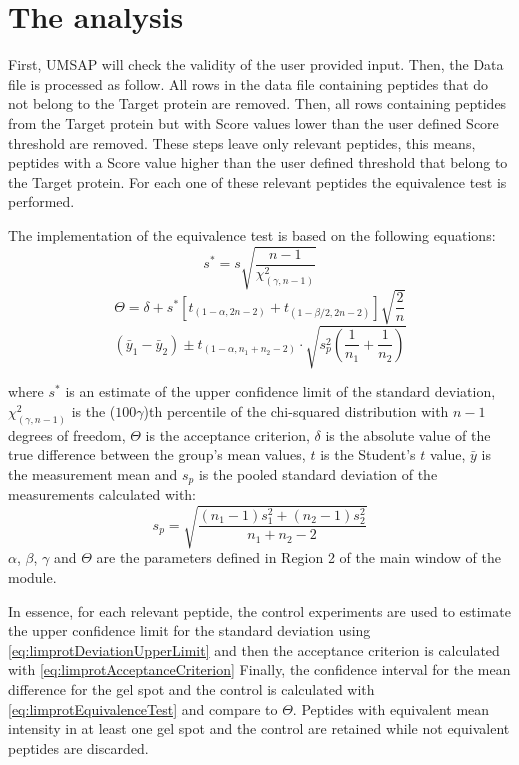 \section{The analysis}
\label{sec:limprotEquivalenceTest}
First, UMSAP will check the validity of the user provided input. Then, the Data file is processed as follow. All rows in the data file containing peptides that do not belong to the Target protein are removed. Then, all rows containing peptides from the Target protein but with Score values lower than the user defined Score threshold are removed. These steps leave only relevant peptides, this means, peptides with a Score value higher than the user defined threshold that belong to the Target protein. For each one of these relevant peptides the equivalence test is performed\cite{Limentani2005}.

The implementation of the equivalence test is based on the following equations:
\begin{equation}
	\label{eq:limprotDeviationUpperLimit}
	s^* = s\sqrt{\frac{n-1}{\chi^2_{(\gamma, n-1)}}}
\end{equation}
\begin{equation}
\label{eq:limprotAcceptanceCriterion}
\Theta = \delta + s^*\left[t_{(1-\alpha, 2n-2)} + t_{(1-\beta/2, 2n-2)}\right]\sqrt{\frac{2}{n}}
\end{equation}
\begin{equation}
\label{eq:limprotEquivalenceTest}
(\bar{y}_1 - \bar{y}_2) \pm t_{(1-\alpha, n_1+n_2-2)} \cdot \sqrt{s^2_p\left(\frac{1}{n_1}+\frac{1}{n_2}\right)}
\end{equation}

where $s^*$ is an estimate of the upper confidence limit of the standard deviation, $\chi^2_{(\gamma, n-1)}$ is the ($100\gamma$)th percentile of the chi-squared distribution with $n-1$ degrees of freedom, $\Theta$ is the acceptance criterion, $\delta$ is the absolute value of the true difference between the group's mean values, $t$ is the Student's $t$ value, $\bar{y}$ is the measurement mean and $s_p$ is the pooled standard deviation of the measurements calculated with:
\begin{equation}
\label{eq:poolStDev}
s_p =  \sqrt{\frac{(n_1-1)s^2_1+(n_2-1)s^2_2}{n_1+n_2-2}}
\end{equation}
$\alpha$, $\beta$, $\gamma$ and $\Theta$ are the parameters defined in Region \num{2} of the main window of the module.

In essence, for each relevant peptide, the control experiments are used to estimate the upper confidence limit for the standard deviation using \autoref{eq:limprotDeviationUpperLimit} and then the acceptance criterion is calculated with \autoref{eq:limprotAcceptanceCriterion} Finally, the confidence interval for the mean difference for the gel spot and the control is calculated with \autoref{eq:limprotEquivalenceTest} and compare to $\Theta$. Peptides with equivalent mean intensity in at least one gel spot and the control are retained while not equivalent peptides are discarded. 

